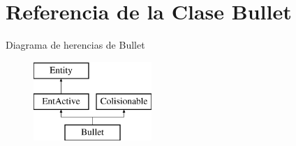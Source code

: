\hypertarget{classBullet}{\section{Referencia de la Clase Bullet}
\label{classBullet}
}
Diagrama de herencias de Bullet\begin{figure}[H]
\begin{center}
\leavevmode
\includegraphics[height=3.000000cm]{classBullet}
\end{center}
\end{figure}
